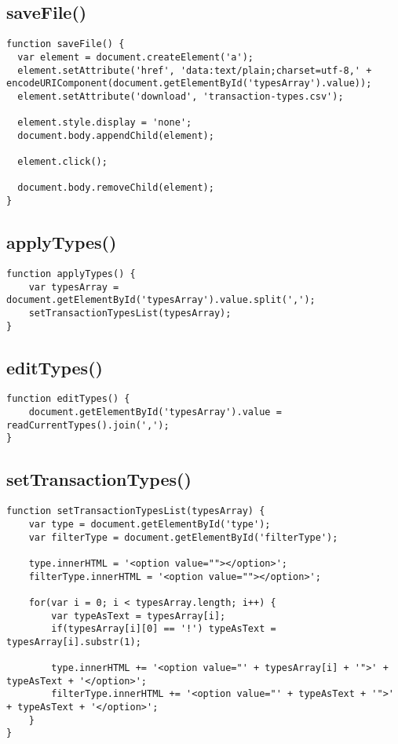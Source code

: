 \documentclass[letterpaper]{article}
\begin{document}
\subsection{saveFile()}

\begin{lstlisting}[firstnumber=655]
function saveFile() {
  var element = document.createElement('a');
  element.setAttribute('href', 'data:text/plain;charset=utf-8,' + encodeURIComponent(document.getElementById('typesArray').value));
  element.setAttribute('download', 'transaction-types.csv');

  element.style.display = 'none';
  document.body.appendChild(element);

  element.click();

  document.body.removeChild(element);
}
\end{lstlisting}

\subsection{applyTypes()}

\begin{lstlisting}[firstnumber=668]
function applyTypes() {
    var typesArray = document.getElementById('typesArray').value.split(',');
    setTransactionTypesList(typesArray);
}
\end{lstlisting}

\subsection{editTypes()}

\begin{lstlisting}[firstnumber=673]
function editTypes() {
    document.getElementById('typesArray').value = readCurrentTypes().join(',');
}
\end{lstlisting}

\subsection{setTransactionTypes()}

\begin{lstlisting}[firstnumber=677]
function setTransactionTypesList(typesArray) {
    var type = document.getElementById('type');
    var filterType = document.getElementById('filterType');

    type.innerHTML = '<option value=""></option>';
    filterType.innerHTML = '<option value=""></option>';

    for(var i = 0; i < typesArray.length; i++) {
        var typeAsText = typesArray[i];
        if(typesArray[i][0] == '!') typeAsText = typesArray[i].substr(1);

        type.innerHTML += '<option value="' + typesArray[i] + '">' + typeAsText + '</option>';
        filterType.innerHTML += '<option value="' + typeAsText + '">' + typeAsText + '</option>';
    }
}
\end{lstlisting}
\end{document}
